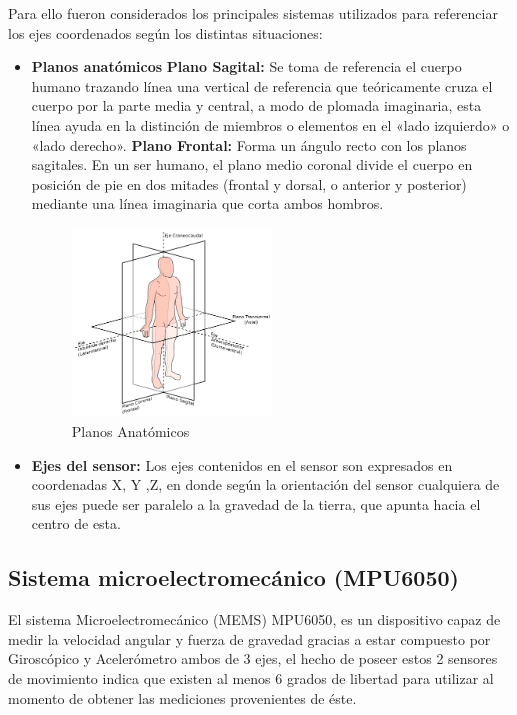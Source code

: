 \documentclass[12pt,a4paper]{article}
\begin{document}
Para ello fueron considerados los principales sistemas utilizados para referenciar los ejes coordenados según los distintas situaciones:
\begin{itemize}
	
	\item \textbf{Planos anatómicos} 
		\subitem \textbf{Plano Sagital:}
		 Se toma de referencia el cuerpo humano trazando línea una  vertical de referencia que teóricamente cruza el cuerpo por la parte media y central, a modo de plomada imaginaria, esta línea ayuda en la distinción de miembros o elementos en el «lado izquierdo» o «lado derecho».
		 \subitem \textbf{Plano Frontal:} Forma un ángulo recto con los planos sagitales. En un ser humano, el plano medio coronal divide el cuerpo en posición de pie en dos mitades (frontal y dorsal, o anterior y posterior) mediante una línea imaginaria que corta ambos hombros.

	\begin{figure}[H]
		\centering
		\includegraphics[width=0.5\textwidth]{images/planosAnatomicos}
		\caption{Planos Anatómicos}
		\label{fig:sagital}
	\end{figure}

	\item \textbf{Ejes del sensor:} Los ejes contenidos en el sensor son expresados en coordenadas X, Y ,Z, en donde según la orientación del sensor cualquiera de sus ejes puede ser paralelo a la gravedad de la tierra, que apunta hacia el centro de esta.
\end{itemize}

\newpage
\subsection{Sistema microelectromecánico (MPU6050)}
El sistema Microelectromecánico (MEMS) MPU6050\cite{MPU6050}, es un dispositivo capaz de medir la velocidad angular y fuerza de gravedad gracias a estar compuesto por Giroscópico y Acelerómetro ambos de 3 ejes, el hecho de poseer estos 2 sensores de movimiento indica que existen al menos 6 grados de libertad para utilizar al momento de obtener las mediciones provenientes de éste.
\end{document}
